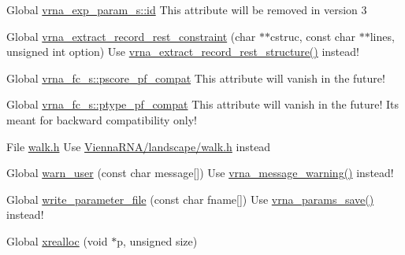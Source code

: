 \begin{DoxyRefList}
\item[Global \mbox{\hyperlink{group__energy__parameters_a378d5bcf2bae1f3ec84c912c7d3908d2}{vrna\+\_\+exp\+\_\+param\+\_\+s::id}} ]\label{deprecated__deprecated000149}%
%
This attribute will be removed in version 3  
\item[Global \mbox{\hyperlink{group__file__formats_ga55a9ae6dfeecc1b3f0c2acf6fa796c15}{vrna\+\_\+extract\+\_\+record\+\_\+rest\+\_\+constraint}} (char $\ast$$\ast$cstruc, const char $\ast$$\ast$lines, unsigned int option)]\label{deprecated__deprecated000162}%
%
Use \mbox{\hyperlink{group__file__formats_gad37cbb63a05eed63ba25c91628409be0}{vrna\+\_\+extract\+\_\+record\+\_\+rest\+\_\+structure()}} instead!  
\item[Global \mbox{\hyperlink{group__fold__compound_abf5e82d14649b6179ae60ed7da6e4fc0}{vrna\+\_\+fc\+\_\+s::pscore\+\_\+pf\+\_\+compat}} ]\label{deprecated__deprecated000080}%
%
This attribute will vanish in the future!  
\item[Global \mbox{\hyperlink{group__fold__compound_a7fe1235ce3d41287695f1ae1e283e8fc}{vrna\+\_\+fc\+\_\+s::ptype\+\_\+pf\+\_\+compat}} ]\label{deprecated__deprecated000079}%
%
This attribute will vanish in the future! It\textquotesingle{}s meant for backward compatibility only!  
\item[File \mbox{\hyperlink{walk_8h}{walk.h}} ]\label{deprecated__deprecated000139}%
%
Use \mbox{\hyperlink{landscape_2walk_8h}{Vienna\+R\+N\+A/landscape/walk.\+h}} instead  
\item[Global \mbox{\hyperlink{utils_2basic_8h_af2355fa8746f2f30fbe71db65dea3d51}{warn\+\_\+user}} (const char message\mbox{[}\mbox{]})]\label{deprecated__deprecated000183}%
%
Use \mbox{\hyperlink{group__message__utils_ga6e07ed24add60693ba886d54d0a46635}{vrna\+\_\+message\+\_\+warning()}} instead!  
\item[Global \mbox{\hyperlink{group__energy__parameters__rw_ga8a43459be386a7489feeab68dc2c6c76}{write\+\_\+parameter\+\_\+file}} (const char fname\mbox{[}\mbox{]})]\label{deprecated__deprecated000151}%
%
Use \mbox{\hyperlink{group__energy__parameters__rw_ga0de3731b3e4017c52bd678549f6c4ae5}{vrna\+\_\+params\+\_\+save()}} instead!  
\item[Global \mbox{\hyperlink{utils_2basic_8h_a9037ada838835b1b9db41581a021b0c8}{xrealloc}} (void $\ast$p, unsigned size)]\label{deprecated__deprecated000186}%

\end{DoxyRefList}
